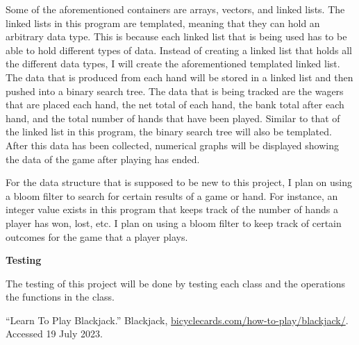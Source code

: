\documentclass[a4paper,9pt]{article}
\begin{document}
\noindent Some of the aforementioned containers are arrays, vectors, and linked lists. The linked lists in this program are templated, meaning that they can hold an arbitrary data type. This is because each
linked list that is being used has to be able to hold different types of data. Instead of creating a linked list that holds all the different data types, I will create the aforementioned templated linked list. 
The data that is produced from each hand will be stored in a linked list and then pushed into a binary search tree. The data that is being tracked are the wagers that are placed each hand, the net total of 
each hand, the bank total after each hand, and the total number of hands that have been played. Similar to that of the linked list in this program, the binary search tree will also be templated. After this 
data has been collected, numerical graphs will be displayed showing the data of the game after playing has ended. \newline

For the data structure that is supposed to be new to this project, I plan on using a bloom filter to search for certain results of a game or hand. For instance, an integer value exists in this program that keeps
track of the number of hands a player has won, lost, etc. I plan on using a bloom filter to keep track of certain outcomes for the game that a player plays.

\noindent \textbf{Testing} \newline

The testing of this project will be done by testing each class and the operations the functions in the class.

\clearpage

\begin{thebibliography}{99}
    “Learn To Play Blackjack.” Blackjack, \href{https://bicyclecards.com/how-to-play/blackjack/}{bicyclecards.com/how-to-play/blackjack/}. Accessed 19 July 2023. 
\end{thebibliography}
\end{document}

